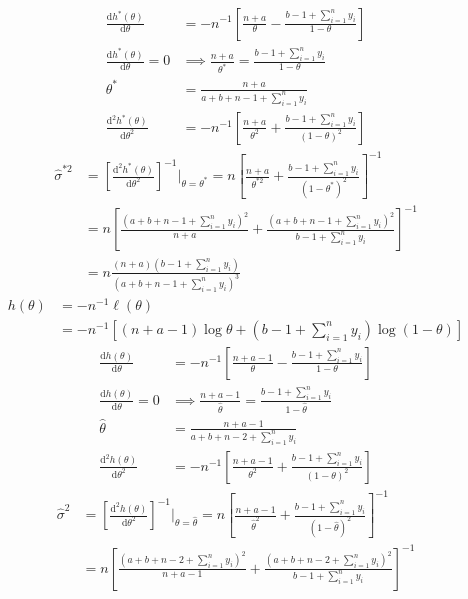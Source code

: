 \documentclass[a4paper,12pt]{article}\usepackage[]{graphicx}\usepackage[]{color}
\newcommand{\id}{\mathrm{d}}
\begin{document}
\begin{enumerate}[label=(\alph*)]
\begin{align*}
\end{align*}
\begin{align*}
\frac{\id h^*(\theta)}{\id\theta} &= -n^{-1}\left[\frac{n+a}{\theta}-\frac{b-1+\sum_{i=1}^ny_i}{1-\theta}\right]\\
\frac{\id h^*(\theta)}{\id\theta}=0&\implies \frac{n+a}{\theta^*}=\frac{b-1+\sum_{i=1}^ny_i}{1-\theta} \\
\theta^*&=\frac{n+a}{a+b+n-1+\sum_{i=1}^ny_i} \\
\frac{\id^2 h^*(\theta)}{\id\theta^2} &= -n^{-1}\left[\frac{n+a}{\theta^2}+\frac{b-1+\sum_{i=1}^ny_i}{(1-\theta)^2}\right]
\end{align*}
\begin{align*}
\hat\sigma^{*2}&=\left[\frac{\id^2 h^*(\theta)}{\id\theta^2}\right]^{-1}\bigg\rvert_{\theta=\theta^*}=n\left[\frac{n+a}{\theta^{*2}}+\frac{b-1+\sum_{i=1}^ny_i}{(1-\theta^*)^2}\right]^{-1} \\
&=n\left[\frac{\left(a+b+n-1+\sum_{i=1}^ny_i\right)^2}{n+a}+\frac{\left(a+b+n-1+\sum_{i=1}^ny_i\right)^2}{b-1+\sum_{i=1}^ny_i}\right]^{-1} \\
&= n\frac{(n+a)(b-1+\sum_{i=1}^ny_i)}{\left(a+b+n-1+\sum_{i=1}^ny_i\right)^3}
\end{align*}
\begin{align*}
h(\theta)&=-n^{-1}\ell(\theta) \\
&= -n^{-1}\left[(n+a-1)\log\theta+\left(b-1+\sum_{i=1}^ny_i\right)\log(1-\theta)\right]
\end{align*}
\begin{align*}
\frac{\id h(\theta)}{\id\theta} &= -n^{-1}\left[\frac{n+a-1}{\theta}-\frac{b-1+\sum_{i=1}^ny_i}{1-\theta}\right]\\
\frac{\id h(\theta)}{\id\theta}=0&\implies \frac{n+a-1}{\hat\theta}=\frac{b-1+\sum_{i=1}^ny_i}{1-\hat\theta} \\
\hat\theta&=\frac{n+a-1}{a+b+n-2+\sum_{i=1}^ny_i} \\
\frac{\id^2 h(\theta)}{\id\theta^2} &= -n^{-1}\left[\frac{n+a-1}{\theta^2}+\frac{b-1+\sum_{i=1}^ny_i}{(1-\theta)^2}\right]
\end{align*}
\begin{align*}
\hat\sigma^{2}&=\left[\frac{\id^2 h(\theta)}{\id\theta^2}\right]^{-1}\bigg\rvert_{\theta=\hat\theta}=n\left[\frac{n+a-1}{\hat\theta^2}+\frac{b-1+\sum_{i=1}^ny_i}{(1-\hat\theta)^2}\right]^{-1} \\
&=n\left[\frac{\left(a+b+n-2+\sum_{i=1}^ny_i\right)^2}{n+a-1}+\frac{\left(a+b+n-2+\sum_{i=1}^ny_i\right)^2}{b-1+\sum_{i=1}^ny_i}\right]^{-1} \\

\end{align*}
\end{enumerate}
\end{document}
